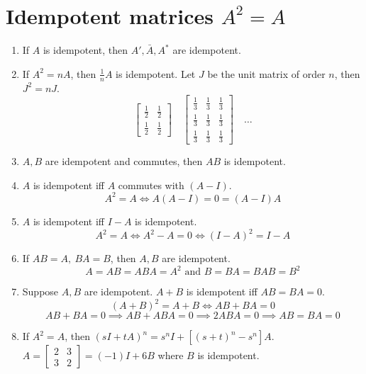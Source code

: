 \section{Idempotent matrices $A^2 = A$}
\begin{enumerate}
	\item If $A$ is idempotent, then $A',\bar{A},A^\ast$ are idempotent.
	\item If $A^2 = nA$, then $\frac{1}{n}A$ is idempotent.
		\subitem Let $J$ be the unit matrix of order $n$, then $J^2 = nJ$.
	$$\begin{bmatrix}\frac{1}{2} & \frac{1}{2} \\ \frac{1}{2} & \frac{1}{2} \end{bmatrix} \quad \begin{bmatrix}\frac{1}{3} & \frac{1}{3} & \frac{1}{3} \\ \frac{1}{3} & \frac{1}{3} & \frac{1}{3} \\ \frac{1}{3} & \frac{1}{3} & \frac{1}{3} \end{bmatrix} \quad \dots $$
	\item $A,B$ are idempotent and commutes, then $AB$ is idempotent.
	\item $A$ is idempotent iff $A$ commutes with $(A-I)$.  $$A^2 = A \iff A(A-I)= 0 = (A-I)A$$
	\item $A$ is idempotent iff $I-A$ is idempotent.
		$$A^2 = A \iff A^2-A = 0 \iff (I-A)^2=I-A$$
	\item If $AB=A,\ BA=B$, then $A,B$ are idempotent.
		$$ A = AB = ABA = A^2 \text{ and } B = BA = BAB = B^2 $$
	\item Suppose $A,B$ are idempotent. $A+B$ is idempotent iff $AB=BA=0$.
		$$ (A+B)^2 = A+B \iff AB+BA = 0 $$
		$$ AB+BA = 0 \implies AB + ABA = 0 \implies 2ABA = 0 \implies AB = BA = 0$$
	\item If $A^2 = A$, then $(sI+tA)^n = s^nI + [(s+t)^n-s^n]A$.
		\subitem $ A = \begin{bmatrix} 2 & 3 \\ 3 & 2 \end{bmatrix} = (-1)I+6B $ where $B$ is idempotent.
\end{enumerate}

